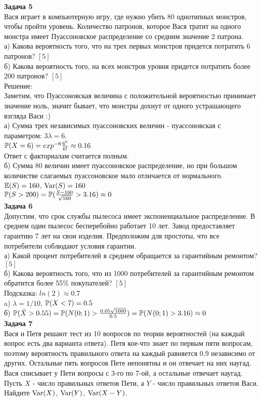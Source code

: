 \documentclass[pdftex,12pt,a4paper]{article}
\begin{document}
\textbf{Задача 5} \\ 
Вася играет в компьютерную игру, где нужно убить 80 однотипных монстров, чтобы пройти уровень. Количество патронов, которое Вася тратит на одного монстра имеет Пуассоновское распределение со средним значение 2 патрона. \\
а) Какова вероятность того, что на трех первых монстров придется потратить 6 патронов? $[5]$ \\
б) Какова вероятность того, на всех монстров уровня придется потратить более 200 патронов? $[5]$ \\
Решение: \\
Заметим, что Пуассоновская величина с положительной вероятностью принимает значение ноль, значит бывает, что монстры дохнут от одного устрашающего взгляда Васи :) \\
а) Сумма трех независимых пуассоновских величин - пуассоновская с параметром: $3\lambda=6$. \\
$\P(X=6)=exp^{-6}\frac{6^6}{6!}\approx 0.16$ \\
Ответ с факториалам считается полным. \\
б) Сумма 80 величин имеет пуассоновское распределение, но при большом количистве слагаемых пуассоновское мало отличается от нормального. \\
$\E(S)=160$, $\Var(S)=160$ \\
$\P(S>200)=\P(\frac{S-160}{\sqrt{160}}>3.16)\approx 0$ \\



\textbf{Задача 6} \\ 
Допустим, что срок службы пылесоса имеет экспоненциальное распределение. В среднем один пылесос бесперебойно работает 10 лет. Завод предоставляет гарантию 7 лет на свои изделия. Предположим для простоты, что все потребители соблюдают условия гарантии. \\
а) Какой процент потребителей в среднем обращается за гарантийным ремонтом? $[5]$ \\
б) Какова вероятность того, что из 1000 потребителей за гарантийным ремонтом обратится более 55\% покупателей? $[5]$ \\
Подсказка: $ln(2)\approx 0.7$ \\
a) $\lambda=1/10$, $\P(X<7)=0.5$ \\
б) $\P(\bar{X}>0.55)=\P(N(0;1)>\frac{0.05\sqrt{1000}}{0.5})=\P(N(0;1)>3.16)\approx 0$ \\


\textbf{Задача 7} \\ %
Вася и Петя решают тест из 10 вопросов по теории вероятностей (на каждый вопрос есть два варианта ответа). Петя кое-что знает по первым пяти вопросам, поэтому вероятность правильного ответа на каждый равняется 0.9 независимо от других. Остальные пять вопросов Пете непонятны и он отвечает на них наугад. Вася списывает у Пети вопросы с 3-го по 7-ой, а остальные отвечает наугад. \\
Пусть $X$ - число правильных ответов Пети, а $Y$ - число правильных ответов Васи. \\
Найдите $\Var(X)$, $\Var(Y)$, $\Var(X-Y)$. \\
\end{document}

